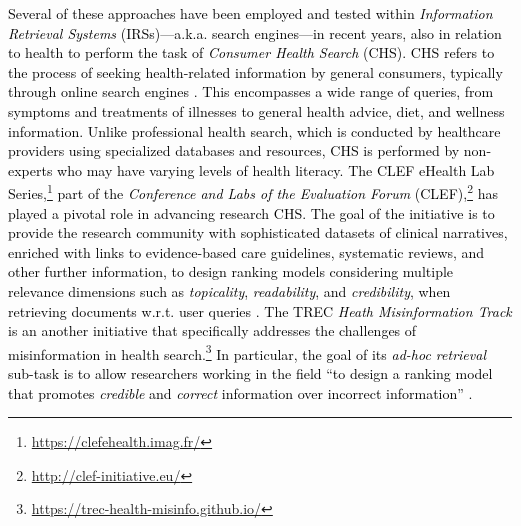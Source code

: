 \textcolor{black}{Several of these approaches have been employed and tested within \textit{Information Retrieval Systems} (IRSs)\textcolor{black}{—a.k.a. search engines—}in recent years, also in relation to health to perform the task of \textit{Consumer Health Search} (CHS). CHS refers to the process of seeking health-related information by general consumers, typically through online search engines \cite{goeuriot2021consumer}. This encompasses a wide range of queries, from symptoms and treatments of illnesses to general health advice, diet, and wellness information. Unlike professional health search, which is conducted by healthcare providers using specialized databases and resources, CHS is performed by non-experts who may have varying levels of health literacy. The CLEF eHealth Lab Series,\footnote{\url{https://clefehealth.imag.fr/}} part of the \textit{Conference and Labs of the Evaluation Forum} (CLEF),\footnote{\url{http://clef-initiative.eu/}} has played a pivotal role in advancing research CHS. The goal of the initiative is to provide the research community with sophisticated datasets of clinical narratives, enriched with links to evidence-based care guidelines, systematic reviews, and other further information, to design ranking models considering multiple relevance dimensions such as \textit{topicality}, \textit{readability}, and \textit{credibility}, when retrieving documents w.r.t. user queries \citep{goeuriot2021consumer}.} \textcolor{black}{The TREC \textit{Heath Misinformation Track} \textcolor{black}{is an another initiative that specifically addresses the challenges of misinformation in health search.\footnote{\url{https://trec-health-misinfo.github.io/}} In particular, the goal of its \textit{ad-hoc retrieval} sub-task is to allow researchers working in the field} ``to design a ranking model that promotes \textit{credible} and \textit{correct} information over incorrect information'' \cite{clarke2020overview}.}

